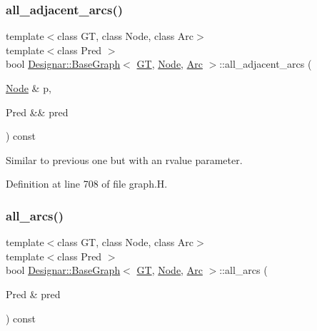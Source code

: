 \subsubsection{\texorpdfstring{all\+\_\+adjacent\+\_\+arcs()}{all\_adjacent\_arcs()}\hspace{0.1cm}{\footnotesize\ttfamily [2/2]}}
{\footnotesize\ttfamily template$<$class GT, class Node, class Arc$>$ \\
template$<$class Pred $>$ \\
bool \hyperlink{class_designar_1_1_base_graph}{Designar\+::\+Base\+Graph}$<$ \hyperlink{demo-buildgraph_8_c_a3001c40d2c31ca87ed96cd7d1334a55e}{GT}, \hyperlink{namespace_designar_a5af326c65aa2bd26b26c410f2030d09e}{Node}, \hyperlink{namespace_designar_a3f55fb5513d62ff47cbc8f72b8e95d6f}{Arc} $>$\+::all\+\_\+adjacent\+\_\+arcs (\begin{DoxyParamCaption}\item[{\hyperlink{namespace_designar_a5af326c65aa2bd26b26c410f2030d09e}{Node} \&}]{p,  }\item[{Pred \&\&}]{pred }\end{DoxyParamCaption}) const\hspace{0.3cm}{\ttfamily [inline]}}



Similar to previous one but with an rvalue parameter. 



Definition at line 708 of file graph.\+H.

\mbox{\label{class_designar_1_1_base_graph_a3e2a55dafde6b1edf42f88f4c7d066b8}} 
\subsubsection{\texorpdfstring{all\+\_\+arcs()}{all\_arcs()}\hspace{0.1cm}{\footnotesize\ttfamily [1/2]}}
{\footnotesize\ttfamily template$<$class GT, class Node, class Arc$>$ \\
template$<$class Pred $>$ \\
bool \hyperlink{class_designar_1_1_base_graph}{Designar\+::\+Base\+Graph}$<$ \hyperlink{demo-buildgraph_8_c_a3001c40d2c31ca87ed96cd7d1334a55e}{GT}, \hyperlink{namespace_designar_a5af326c65aa2bd26b26c410f2030d09e}{Node}, \hyperlink{namespace_designar_a3f55fb5513d62ff47cbc8f72b8e95d6f}{Arc} $>$\+::all\+\_\+arcs (\begin{DoxyParamCaption}\item[{Pred \&}]{pred }\end{DoxyParamCaption}) const\hspace{0.3cm}{\ttfamily [inline]}}



